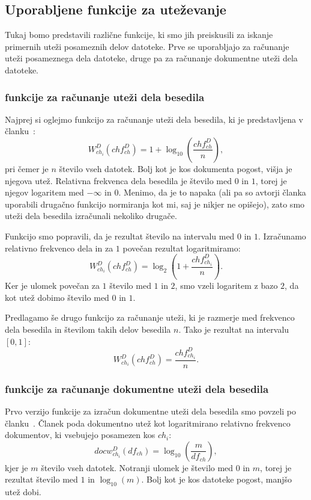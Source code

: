 \documentclass{acm_proc_article-sp}
\begin{document}
\subsection{Uporabljene funkcije za uteževanje}
\label{weight-functions}

Tukaj bomo predstavili različne funkcije, ki smo jih preiskusili za iskanje primernih uteži posameznih delov datoteke. Prve se uporabljajo za računanje uteži posameznega dela datoteke, druge pa za računanje dokumentne uteži dela datoteke.

\subsubsection{funkcije za računanje uteži dela besedila}\label{utezivclanku}
Najprej si oglejmo funkcijo za računanje uteži dela besedila, ki je predstavljena v članku~\cite{fbhash}:
\[ W_{ch_i}^{D}(ch f_{ch}^D) = 1 + \log_{10}\left(\frac{ch f_{ch}^D}{n}\right),\]
pri čemer je $n$ število vseh datotek. Bolj kot je kos dokumenta pogost, višja je njegova utež. Relativna frekvenca dela besedila je število med $0$ in $1$, torej je njegov logaritem med $-\infty$ in $0$. Menimo, da je to napaka (ali pa so avtorji članka uporabili drugačno funkcijo normiranja kot mi, saj je nikjer ne opišejo), zato smo uteži dela besedila izračunali nekoliko drugače.

Funkcijo smo popravili, da je rezultat število na intervalu med $0$ in $1$. Izračunamo relativno frekvenco dela in za $1$ povečan rezultat logaritmiramo:
\[ W_{ch_i}^{D}(ch f_{ch}^D) = \log_2\left(1 + \frac{ch f_{ch_i}^D}{n}\right). \]
Ker je ulomek povečan za $1$ število med $1$ in $2$, smo vzeli logaritem z bazo $2$, da kot utež dobimo število med $0$ in $1$. 

Predlagamo še drugo funkcijo za računanje uteži, ki je razmerje med frekvenco dela besedila in številom takih delov besedila $n$. Tako je rezultat na intervalu $[0,1]$:
\[ W_{ch_i}^{D}(ch f_{ch}^D) = \frac{ch f_{ch_i}^D}{n}. \]

\subsubsection{funkcije za računanje dokumentne uteži dela besedila}
Prvo verzijo funkcije za izračun dokumentne uteži dela besedila smo povzeli po članku~\cite{fbhash}. Članek poda dokumentno utež kot logaritmirano relativno frekvenco dokumentov, ki vsebujejo posamezen kos $ch_i$:
\[ docw_{ch_i}^{D}(df_{ch}) = \log_{10}\left(\frac{m}{df_{ch}}\right), \]
kjer je $m$ število vseh datotek. Notranji ulomek je število med $0$ in $m$, torej je rezultat število med $1$ in $\log_{10}(m)$. Bolj kot je kos datoteke pogost, manjšo utež dobi.
\end{document}
